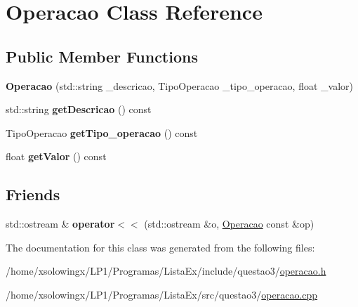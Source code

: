 \hypertarget{classOperacao}{}\section{Operacao Class Reference}
\label{classOperacao}
\subsection*{Public Member Functions}
\begin{DoxyCompactItemize}
\item 
\mbox{\label{classOperacao_ae4468beed2e7eb355cc953fc8cb8d1ca}} 
{\bfseries Operacao} (std\+::string \+\_\+descricao, Tipo\+Operacao \+\_\+tipo\+\_\+operacao, float \+\_\+valor)
\item 
\mbox{\label{classOperacao_a35f87140b7cfb4630d0fb990fca04a93}} 
std\+::string {\bfseries get\+Descricao} () const
\item 
\mbox{\label{classOperacao_a722ca5d89c46ca6ac74ba09a384b3373}} 
Tipo\+Operacao {\bfseries get\+Tipo\+\_\+operacao} () const
\item 
\mbox{\label{classOperacao_aec71392c25861acd3c7eee0cf9a740f7}} 
float {\bfseries get\+Valor} () const
\end{DoxyCompactItemize}
\subsection*{Friends}
\begin{DoxyCompactItemize}
\item 
\mbox{\label{classOperacao_ac2839c47d817b524aa30e0ee1e32fe87}} 
std\+::ostream \& {\bfseries operator$<$$<$} (std\+::ostream \&o, \hyperlink{classOperacao}{Operacao} const \&op)
\end{DoxyCompactItemize}


The documentation for this class was generated from the following files\+:\begin{DoxyCompactItemize}
\item 
/home/xsolowingx/\+L\+P1/\+Programas/\+Lista\+Ex/include/questao3/\hyperlink{operacao_8h}{operacao.\+h}\item 
/home/xsolowingx/\+L\+P1/\+Programas/\+Lista\+Ex/src/questao3/\hyperlink{operacao_8cpp}{operacao.\+cpp}\end{DoxyCompactItemize}
